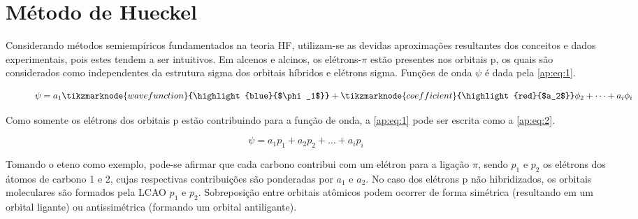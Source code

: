 \chapter{Método de Hueckel}

Considerando métodos semiempíricos fundamentados na teoria \gls{HF}, utilizam-se as devidas aproximações resultantes dos conceitos e dados experimentais, pois estes tendem a ser intuitivos. Em alcenos e alcinos, os elétrons-$\pi$ estão presentes nos orbitais p, os quais são considerados como independentes da estrutura sigma dos orbitais híbridos e elétrons sigma. Funções de onda $\psi$ é dada pela \autoref{ap:eq:1}.

\begin{figure}[htb]
    \vspace{2\baselineskip}
\begin{equation}
    \label{ap:eq:1}
    \psi =  a_1\tikzmarknode{wavefunction}{\highlight{blue}{$\phi_1$}} + \tikzmarknode{coefficient}{\highlight{red}{$a_2$}}\phi_2 + \dots + a_i \phi_i
\end{equation}
\end{figure}

Como somente os elétrons dos orbitais p estão contribuindo para a função de onda, a \autoref{ap:eq:1} pode ser escrita como a \autoref{ap:eq:2}.

\begin{figure}[htb]
    \vspace{2\baselineskip}
\begin{equation}
    \label{ap:eq:2}
    \psi = a_1 p_1 + a_2 p_2 + \dots + a_i p_i
\end{equation}
\end{figure}

Tomando o eteno como exemplo, pode-se afirmar que cada carbono contribui com um elétron para a ligação $\pi$, sendo $p_1$ e $p_2$ os elétrons dos átomos de carbono 1 e 2, cujas respectivas contribuições são ponderadas por $a_1$ e $a_2$. No caso dos elétrons p não hibridizados, os orbitais moleculares são formados pela \gls{LCAO} $p_1$ e $p_2$. Sobreposição entre orbitais atômicos podem ocorrer de forma simétrica (resultando em um orbital ligante) ou antissimétrica (formando um orbital antiligante).

